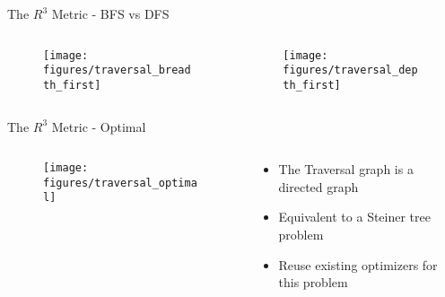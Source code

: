 \begin{frame}{The $ R^{3} $ Metric - BFS vs DFS}
    \begin{columns}[T] %
        \begin{column}{.48\textwidth}

       \begin{figure}
            \centering
            \texttt{[image: figures/traversal\_breadth\_first]}
        \end{figure}

        \end{column}%
        \hfill%
        \begin{column}{.48\textwidth}
            \begin{figure}
                \centering
                \texttt{[image: figures/traversal\_depth\_first]}
            \end{figure}    
        \end{column}%
    \end{columns}
\end{frame}


\begin{frame}{The $ R^{3} $ Metric - Optimal}
    \begin{columns}[T] %
        \begin{column}{.48\textwidth}

       \begin{figure}
            \centering
            \texttt{[image: figures/traversal\_optimal]}
        \end{figure}

        \end{column}%
        \hfill%
        \begin{column}{.48\textwidth}
            \bigskip
            \begin{itemize}
                \item The Traversal graph is a directed graph
                \item Equivalent to a Steiner tree problem
                \item Reuse existing optimizers for this problem
            \end{itemize}
        \end{column}%
    \end{columns}
\end{frame}

